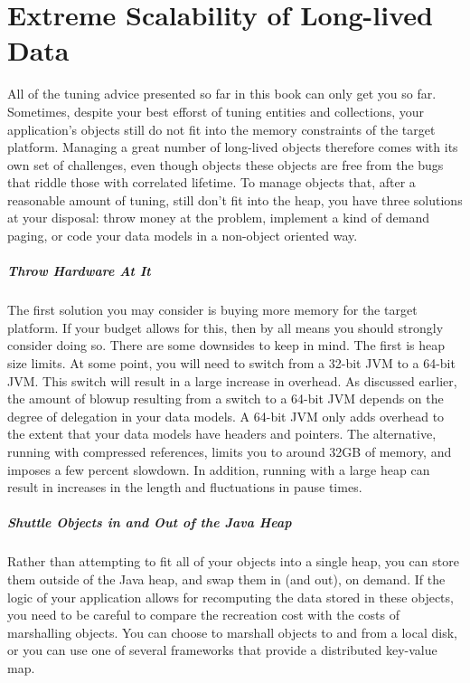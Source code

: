 
\chapter{Extreme Scalability of Long-lived Data}
\label{chapter:large-long-lived}

All of the tuning advice presented so far in this book can only get you so far.
Sometimes, despite your best efforst of tuning entities and collections, your
application's objects still do not fit into the memory constraints of the target
platform. Managing a great number of long-lived objects therefore comes with its
own set of challenges, even though objects these objects are free from the bugs
that riddle those with correlated lifetime. To manage objects that, after a
reasonable amount of tuning, still don't fit into the heap, you have three
solutions at your disposal: throw money at the problem, implement a kind of
demand paging, or code your data models in a non-object oriented way.

\paragraph{Throw Hardware At It} The first solution you may consider is buying
more memory for the target platform. If your budget allows for this, then by all
means you should strongly consider doing so. There are some downsides to keep in
mind. The first is heap size limits. At some point, you will need to switch from
a 32-bit JVM to a 64-bit JVM. This switch will result in a large increase in
overhead. As discussed earlier, the amount of blowup resulting from a switch to a
64-bit JVM depends on the degree of delegation in your data models. A 64-bit JVM
only adds overhead to the extent that your data models have headers and pointers.
The alternative, running with compressed references, limits you to around 32GB
of memory, and imposes a few percent slowdown. In addition, running with a
large heap can result in increases in the length and fluctuations in pause
times.

\paragraph{Shuttle Objects in and Out of the Java Heap} Rather than attempting to
fit all of your objects into a single heap, you can store them outside of the
Java heap, and swap them in (and out), on demand. If the logic of your
application allows for recomputing the data stored in these objects, you need to
be careful to compare the recreation cost with the costs of marshalling objects.
You can choose to marshall objects to and from a local disk, or you can use one
of several frameworks that provide a distributed key-value map.

